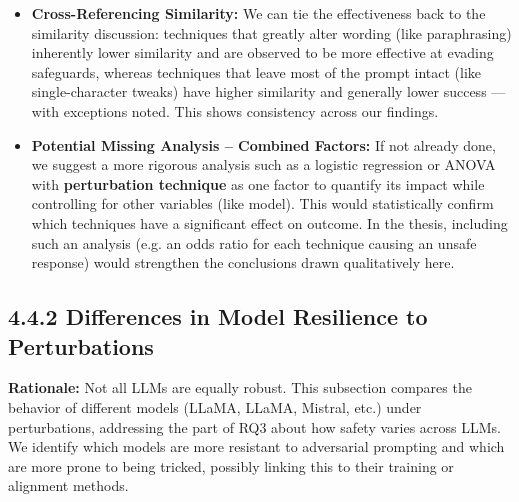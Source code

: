 \begin{itemize}
  \item \textbf{Cross\--Referencing Similarity:} We can tie the effectiveness back to the similarity discussion: techniques that greatly alter wording (like paraphrasing) inherently lower similarity and are observed to be more effective at evading safeguards, whereas techniques that leave most of the prompt intact (like single\--character tweaks) have higher similarity and generally lower success — with exceptions noted. This shows consistency across our findings.

  \item \textbf{Potential Missing Analysis – Combined Factors:} If not already done, we suggest a more rigorous analysis such as a logistic regression or ANOVA with \textbf{perturbation technique} as one factor to quantify its impact while controlling for other variables (like model). This would statistically confirm which techniques have a significant effect on outcome. In the thesis, including such an analysis (e.g. an odds ratio for each technique causing an unsafe response) would strengthen the conclusions drawn qualitatively here.
\end{itemize}

\subsection{4.4.2 Differences in Model Resilience to Perturbations}
\textbf{Rationale:} Not all LLMs are equally robust. This subsection compares the behavior of different models (LLaMA, LLaMA, Mistral, etc.) under perturbations, addressing the part of RQ3 about how safety varies across LLMs. We identify which models are more resistant to adversarial prompting and which are more prone to being tricked, possibly linking this to their training or alignment methods.

